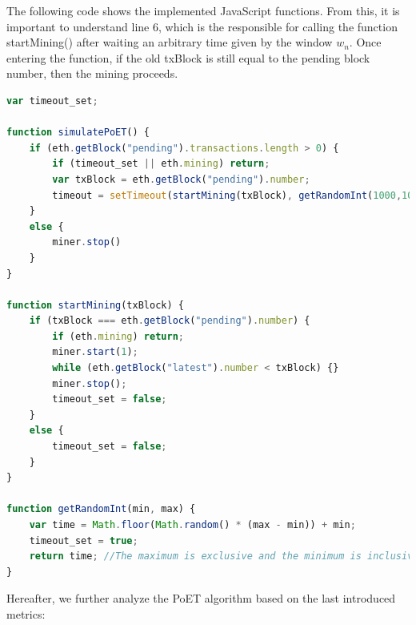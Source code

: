 The following code shows the implemented JavaScript functions. From this, it is important to understand line 6, which is the responsible for calling the function startMining() after waiting an arbitrary time given by the window $w_n$. Once entering the function, if the old txBlock is still equal to the pending block number, then the mining proceeds.
\newline

\begin{lstlisting}[language=JavaScript]
var timeout_set;

function simulatePoET() {
    if (eth.getBlock("pending").transactions.length > 0) {
        if (timeout_set || eth.mining) return;
        var txBlock = eth.getBlock("pending").number;
        timeout = setTimeout(startMining(txBlock), getRandomInt(1000,10000));
    }
    else {
        miner.stop()
    }
}

function startMining(txBlock) {
    if (txBlock === eth.getBlock("pending").number) {
        if (eth.mining) return;
        miner.start(1);
        while (eth.getBlock("latest").number < txBlock) {}
        miner.stop();
        timeout_set = false;
    }
    else {
        timeout_set = false;
    }
}

function getRandomInt(min, max) {
    var time = Math.floor(Math.random() * (max - min)) + min;
    timeout_set = true;
    return time; //The maximum is exclusive and the minimum is inclusive
}
\end{lstlisting}

Hereafter, we further analyze the PoET algorithm based on the last introduced metrics: 

